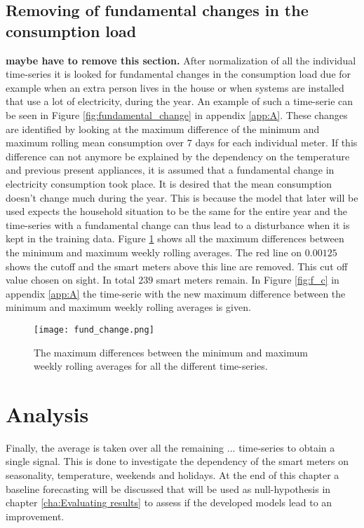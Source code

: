 \subsection{Removing of fundamental changes in the consumption load} 
\textbf{maybe have to remove this section.} 
After normalization of all the individual time-series it is looked for fundamental changes in the consumption load due for example when an extra person lives in the house or when systems are installed that use a lot of electricity, during the year. An example of such a time-serie can be seen in Figure \ref{fig:fundamental_change} in appendix \ref{app:A}.
These changes are identified by looking at the maximum difference of the minimum and maximum rolling mean consumption over $ 7 $ days for each individual meter. If this difference can not anymore be explained by the dependency on the temperature and previous present appliances, it is assumed that a fundamental change in electricity consumption took place. It is desired that the mean consumption doesn't change much during the year. This is because the model that later will be used expects the household situation to be the same for the entire year and the time-series with a fundamental change can thus lead to a disturbance when it is kept in the training data. Figure \ref{fig:fund_change} shows all the maximum differences between the minimum and maximum weekly rolling averages. The red line on $ 0.00125 $shows the cutoff and the smart meters above this line are removed. This cut off value chosen on sight. In total $ 239 $ smart meters remain. In Figure \ref{fig:f_c} in appendix \ref{app:A} the time-serie with the new maximum difference between the minimum and maximum weekly rolling averages is given.

\begin{figure}[h!]
	\centering
	\texttt{[image: fund\_change.png]}
	\caption{The maximum differences between the minimum and maximum weekly rolling averages for all the different time-series.}
	\label{fig:fund_change}
\end{figure}




\section{Analysis}\label{s:Analysis}
Finally, the average is taken over all the remaining $...$ time-series to obtain a single signal. This is done to investigate the dependency of the smart meters on seasonality, temperature, weekends and holidays. At the end of this chapter a baseline forecasting will be discussed that will be used as null-hypothesis in chapter \ref{cha:Evaluating results} to assess if the developed models lead to an improvement.

